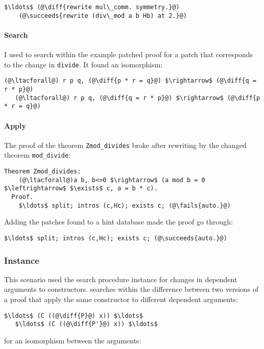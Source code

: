 \begin{lstlisting}[language=coq]
    $\ldots$ (@\diff{rewrite mul\_comm. symmetry.}@)
    (@\succeeds{rewrite (div\_mod a b Hb) at 2.}@)
\end{lstlisting}

\paragraph{Search} I used \sysname to search within the example patched proof for a patch
that corresponds to the change in \lstinline{divide}.
It found an isomorphism:

\begin{lstlisting}[language=coq]
   (@\ltacforall@) r p q, (@\diff{p * r = q}@) $\rightarrow$ (@\diff{q = r * p}@)
   (@\ltacforall@) r p q, (@\diff{q = r * p}@) $\rightarrow$ (@\diff{p * r = q}@)
\end{lstlisting}

\paragraph{Apply} The proof of the theorem \lstinline{Zmod_divides} broke after rewriting by the changed theorem \lstinline{mod_divide}:

\begin{lstlisting}[language=coq]
  Theorem Zmod_divides:
    (@\ltacforall@)a b, b<>0 $\rightarrow$ (a mod b = 0 $\leftrightarrow$ $\exists$ c, a = b * c).
  Proof.
    $\ldots$ split; intros (c,Hc); exists c; (@\fails{auto.}@)
\end{lstlisting}
Adding the patches \sysname found to a hint database made the proof go through:

\begin{lstlisting}[language=coq]
    $\ldots$ split; intros (c,Hc); exists c; (@\succeeds{auto.}@)
\end{lstlisting}

\subsubsection*{Instance}

This scenario used the search procedure instance for changes in dependent arguments to constructors.
\sysname searches within the difference between two versions of a proof that apply the same constructor
to different dependent arguments:

\begin{lstlisting}[language=coq]
   $\ldots$ (C ((@\diff{P}@) x)) $\ldots$
   $\ldots$ (C ((@\diff{P'}@) x)) $\ldots$
\end{lstlisting}
for an isomorphism between the arguments:

